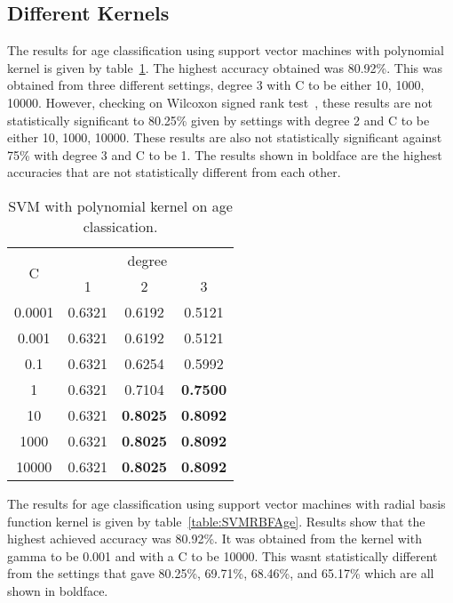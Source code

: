 \documentclass[a4paper]{llncs}
\begin{document}
\subsection{Different Kernels}
The results for age classification using support vector machines with polynomial kernel is given by table~\ref{table:SVMPolyAge}. The highest accuracy obtained was 80.92\%. This was obtained from three different settings, degree 3 with C to be either 10, 1000, 10000. However, checking on Wilcoxon signed rank test~\cite{wilcoxon1945individual}, these results are not statistically significant to 80.25\% given by settings with degree 2 and C to be either 10, 1000, 10000. These results are also not statistically significant against 75\% with degree 3 and C to be 1. The results shown in boldface are the highest accuracies that are not statistically different from each other. 

\begin{table}[!htbp]
\centering
\begin{tabular}{|c|ccc|}
\hline
\multirow{2}{*}{C} & \multicolumn{3}{c|}{degree}       \\ %
                   & 1      & 2      & 3               \\ \hline
0.0001             & 0.6321 & 0.6192 & 0.5121          \\ %
0.001              & 0.6321 & 0.6192 & 0.5121          \\ %
0.1                & 0.6321 & 0.6254 & 0.5992          \\ %
1                  & 0.6321 & 0.7104 & \textbf{0.7500} \\ %
10                 & 0.6321 & \textbf{0.8025} & \textbf{0.8092} \\ %
1000               & 0.6321 & \textbf{0.8025} & \textbf{0.8092} \\ %
10000              & 0.6321 & \textbf{0.8025} & \textbf{0.8092} \\ \hline
\end{tabular}
\caption{SVM with polynomial kernel on age classication.}
\label{table:SVMPolyAge}
\end{table}

The results for age classification using support vector machines with radial basis function kernel is given by table~\ref{table:SVMRBFAge}. Results show that the highest achieved accuracy was 80.92\%. It was obtained from the kernel with gamma to be 0.001 and with a C to be 10000. This wasnt statistically different from the settings that gave 80.25\%, 69.71\%, 68.46\%, and 65.17\% which are all shown in boldface. 
\end{document}
